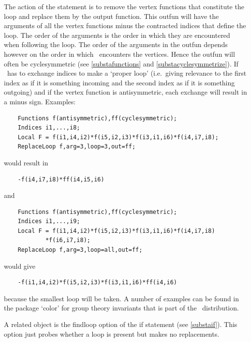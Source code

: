 \noindent The action of the statement is to remove the vertex functions 
that constitute the loop and replace them by the output function. This 
outfun will have the arguments of all the vertex functions minus the 
contracted indices that define the loop. The order of the arguments is the 
order in which they are encountered when following the loop. The order of 
the arguments in the outfun depends however on the order in which \FORM\ 
encounters the vertices. Hence the outfun will often be 
cyclesymmetric (see 
\ref{substafunctions} and \ref{substacyclesymmetrize}). If \FORM\ has to 
exchange indices to make a `proper loop' (i.e.\ giving relevance to the 
first index as if it is something incoming and the second index as if it is 
something outgoing) and if the vertex function is 
antisymmetric, each exchange will 
result in a minus sign. Examples:
\begin{verbatim}
    Functions f(antisymmetric),ff(cyclesymmetric);
    Indices i1,...,i8;
    Local F = f(i1,i4,i2)*f(i5,i2,i3)*f(i3,i1,i6)*f(i4,i7,i8);
    ReplaceLoop f,arg=3,loop=3,out=ff;
\end{verbatim}
would result in
\begin{verbatim}
    -f(i4,i7,i8)*ff(i4,i5,i6)
\end{verbatim}
and
\begin{verbatim}
    Functions f(antisymmetric),ff(cyclesymmetric);
    Indices i1,...,i9;
    Local F = f(i1,i4,i2)*f(i5,i2,i3)*f(i3,i1,i6)*f(i4,i7,i8)
            *f(i6,i7,i8);
    ReplaceLoop f,arg=3,loop=all,out=ff;
\end{verbatim}
would give
\begin{verbatim}
    -f(i1,i4,i2)*f(i5,i2,i3)*f(i3,i1,i6)*ff(i4,i6)
\end{verbatim}
because the smallest loop will be taken. A number of examples can be found 
in the package\index{package!color} `color'\index{color package} for group 
theory\index{group theory} invariants that is part of the \FORM\ 
distribution. 

\noindent A related object is the findloop option of the 
if statement (see \ref{substaif}). This option just probes 
whether a loop is present but makes no replacements.\vspace{10mm}

